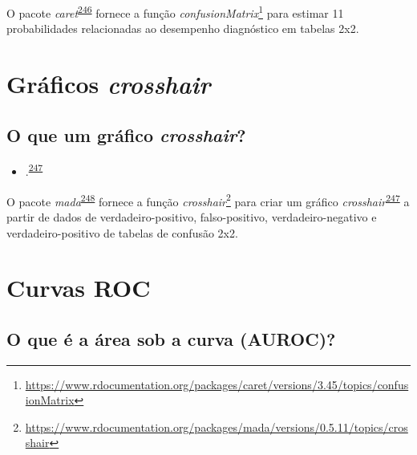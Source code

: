 \documentclass[
  a4paper,
]{book}
\providecommand{\tightlist}{%
  \setlength{\itemsep}{0pt}\setlength{\parskip}{0pt}}
\renewcommand{\href}[2]{#2\footnote{\url{#1}}}
\newenvironment{infobox}[1]
  {
  \begin{itemize}
  \renewcommand{\labelitemi}{
    \raisebox{-.7\height}[0pt][0pt]{
      {\setkeys{Gin}{width=3em,keepaspectratio}
        \texttt{[image: \#1]}}
    }
  }
  \setlength{\fboxsep}{1em}
  \begin{blackbox}
  \item
  }
  {
  \end{blackbox}
  \end{itemize}
  }
\begin{document}
\begin{infobox}{images/Rlogo}
O pacote \emph{caret}\textsuperscript{\protect\hyperlink{ref-caret}{246}} fornece a função \href{https://www.rdocumentation.org/packages/caret/versions/3.45/topics/confusionMatrix}{\emph{confusionMatrix}} para estimar 11 probabilidades relacionadas ao desempenho diagnóstico em tabelas 2x2.

\end{infobox}

\hypertarget{graficos-crosshair}{%
\section{\texorpdfstring{Gráficos \emph{crosshair}}{Gráficos crosshair}}\label{graficos-crosshair}}

\hypertarget{o-que-um-gruxe1fico-crosshair}{%
\subsection{\texorpdfstring{O que um gráfico \emph{crosshair}?}{O que um gráfico crosshair?}}\label{o-que-um-gruxe1fico-crosshair}}

\begin{itemize}
\tightlist
\item
  .\textsuperscript{\protect\hyperlink{ref-phillips2010}{247}}
\end{itemize}

\begin{infobox}{images/Rlogo}
O pacote \emph{mada}\textsuperscript{\protect\hyperlink{ref-mada}{248}} fornece a função \href{https://www.rdocumentation.org/packages/mada/versions/0.5.11/topics/crosshair}{\emph{crosshair}} para criar um gráfico \emph{crosshair}\textsuperscript{\protect\hyperlink{ref-phillips2010}{247}} a partir de dados de verdadeiro-positivo, falso-positivo, verdadeiro-negativo e verdadeiro-positivo de tabelas de confusão 2x2.

\end{infobox}

\hypertarget{curvas-roc}{%
\section{Curvas ROC}\label{curvas-roc}}

\hypertarget{o-que-uxe9-a-uxe1rea-sob-a-curva-auroc}{%
\subsection{O que é a área sob a curva (AUROC)?}\label{o-que-uxe9-a-uxe1rea-sob-a-curva-auroc}}
\end{document}
